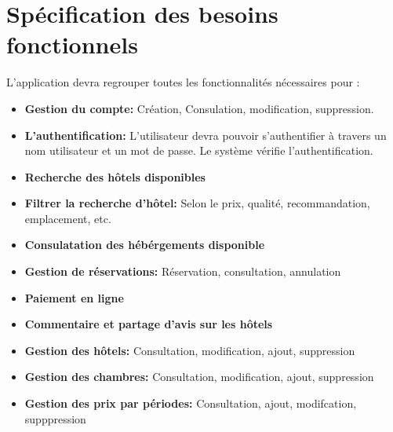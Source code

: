 \documentclass[12pt,a4paper]{report}
\begin{document}
		

		\section{Spécification des besoins fonctionnels}
L’application devra regrouper toutes les fonctionnalités nécessaires pour :\\
				\begin{itemize}
					\item \textbf{Gestion du compte:} Création, Consulation, modification, suppression.
					\item \textbf{L'authentification:} L’utilisateur devra pouvoir s’authentifier à travers un nom utilisateur et un mot de passe. Le système vérifie l’authentification.
					\item \textbf{Recherche des hôtels disponibles}
					\item \textbf{Filtrer la recherche d'hôtel:} Selon le prix, qualité, recommandation, emplacement, etc.
					\item \textbf{Consulatation des hébérgements disponible}
					\item \textbf{Gestion de réservations: } Réservation, consultation, annulation
					\item \textbf{Paiement en ligne}
					\item \textbf{Commentaire et partage d'avis sur les hôtels}
					\item \textbf{Gestion des hôtels: } Consultation, modification, ajout, suppression
					\item \textbf{Gestion des chambres: } Consultation, modification, ajout, suppression
					\item \textbf{Gestion des prix par périodes: } Consultation, ajout, modifcation, supppression
				\end{itemize}
\end{document}
